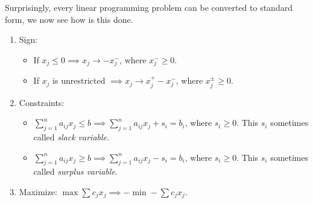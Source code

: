 Surprisingly, every linear programming problem can be converted to standard form, we now see how is this done.
\begin{enumerate}
	\item Sign:\begin{itemize}
		      \item If \(x_{j}\leq 0 \implies x_j \to -x_j^-\), where \(x_{j}^- \geq 0\).
		      \item If \(x_{j}\) is unrestricted \(\implies x_j \to x_j^+ - x_{j}^-\), where \(x_j^{\pm} \geq 0\).
	      \end{itemize}
	\item Constraints:\begin{itemize}
		      \item \(\sum\limits_{j=1}^{n} a_{ij} x_{j} \leq b \implies \sum\limits_{j=1}^{n} a_{ij} x_{j} + s_i = b_{i}\), where \(s_i \geq 0\). This \(s_i\) sometimes called \emph{slack variable}.
		      \item \(\sum\limits_{j=1}^{n} a_{ij} x_{j} \geq b \implies \sum\limits_{j=1}^{n} a_{ij} x_{j} - s_i = b_{i}\), where \(s_i \geq 0\). This \(s_i\) sometimes called \emph{surplus variable}.
	      \end{itemize}
	\item Maximize: \(\max \sum c_{j}x_{j} \implies -\min -\sum c_{j}x_{j}\).
\end{enumerate}




